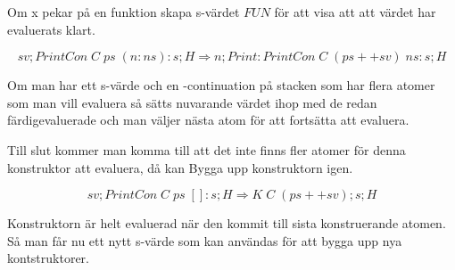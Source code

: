 \documentclass[../Appendix]{subfiles}
\begin{document}
Om x pekar på en funktion skapa s-värdet $FUN$ för att visa att att värdet har
evaluerats klart. 


\[
sv ; PrintCon \; C \; ps \; (n : ns) : s ; H \Rightarrow n ; Print : PrintCon \; C \; (ps ++ sv) \; ns : s ; H
\]

Om man har ett s-värde och en -continuation på stacken som har flera
atomer som man vill evaluera så sätts nuvarande värdet ihop med de redan färdigevaluerade
och man väljer nästa atom för att fortsätta att evaluera.

Till slut kommer man komma till att det inte finns fler atomer för denna konstruktor
att evaluera, då kan Bygga upp konstruktorn igen.

\[
sv ; PrintCon \; C \; ps \; [] : s ; H
\Rightarrow K \; C \; (ps ++ sv) ; s ; H
\]

Konstruktorn är helt evaluerad när den kommit till sista konstruerande atomen. Så
man får nu ett nytt s-värde som kan användas för att bygga upp nya kontstruktorer.
\end{document}
